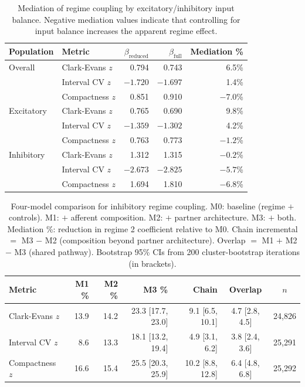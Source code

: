 \documentclass[11pt]{article}
\begin{document}
\begin{table}[H]
\centering
\caption{Mediation of regime coupling by excitatory/inhibitory input balance. Negative mediation values indicate that controlling for input balance increases the apparent regime effect.}
\label{tab:mediation}
\begin{tabular}{llrrr}
\toprule
Population & Metric & $\beta_{\text{reduced}}$ & $\beta_{\text{full}}$ & Mediation \% \\
\midrule
Overall & Clark-Evans $z$ & 0.794 & 0.743 & 6.5\% \\
 & Interval CV $z$ & $-1.720$ & $-1.697$ & 1.4\% \\
 & Compactness $z$ & 0.851 & 0.910 & $-7.0$\% \\
\midrule
Excitatory & Clark-Evans $z$ & 0.765 & 0.690 & 9.8\% \\
 & Interval CV $z$ & $-1.359$ & $-1.302$ & 4.2\% \\
 & Compactness $z$ & 0.763 & 0.773 & $-1.2$\% \\
\midrule
Inhibitory & Clark-Evans $z$ & 1.312 & 1.315 & $-0.2$\% \\
 & Interval CV $z$ & $-2.673$ & $-2.825$ & $-5.7$\% \\
 & Compactness $z$ & 1.694 & 1.810 & $-6.8$\% \\
\bottomrule
\end{tabular}
\end{table}


\begin{table}[H]
\centering
\caption{Four-model comparison for inhibitory regime coupling. M0: baseline (regime $+$ controls). M1: $+$ afferent composition. M2: $+$ partner architecture. M3: $+$ both. Mediation \%: reduction in regime 2 coefficient relative to M0. Chain incremental $=$ M3 $-$ M2 (composition beyond partner architecture). Overlap $=$ M1 $+$ M2 $-$ M3 (shared pathway). Bootstrap 95\% CIs from 200 cluster-bootstrap iterations (in brackets).}
\label{tab:four_model}
\small
\begin{tabular}{lrrrrcc}
\toprule
Metric & M1 \% & M2 \% & M3 \% & Chain & Overlap & $n$ \\
\midrule
Clark-Evans $z$ & 13.9 & 14.2 & 23.3 [17.7, 23.0] & 9.1 [6.5, 10.1] & 4.7 [2.8, 4.5] & 24,826 \\
Interval CV $z$ & 8.6 & 13.3 & 18.1 [13.2, 19.4] & 4.9 [3.1, 6.2] & 3.8 [2.4, 3.6] & 25,291 \\
Compactness $z$ & 16.6 & 15.4 & 25.5 [20.3, 25.9] & 10.2 [8.8, 12.8] & 6.4 [4.8, 6.8] & 25,292 \\
\bottomrule
\end{tabular}
\end{table}
\end{document}
